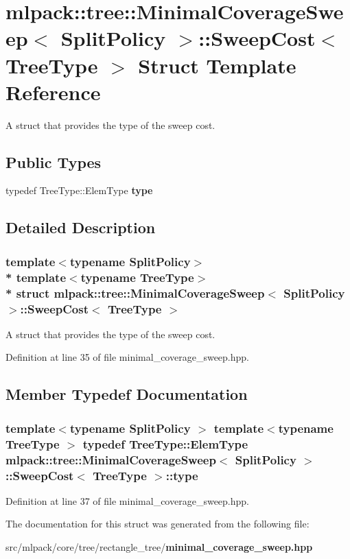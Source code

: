 \section{mlpack\+:\+:tree\+:\+:Minimal\+Coverage\+Sweep$<$ Split\+Policy $>$\+:\+:Sweep\+Cost$<$ Tree\+Type $>$ Struct Template Reference}
\label{structmlpack_1_1tree_1_1MinimalCoverageSweep_1_1SweepCost}


A struct that provides the type of the sweep cost.  


\subsection*{Public Types}
\begin{DoxyCompactItemize}
\item 
typedef Tree\+Type\+::\+Elem\+Type {\bf type}
\end{DoxyCompactItemize}


\subsection{Detailed Description}
\subsubsection*{template$<$typename Split\+Policy$>$\\*
template$<$typename Tree\+Type$>$\\*
struct mlpack\+::tree\+::\+Minimal\+Coverage\+Sweep$<$ Split\+Policy $>$\+::\+Sweep\+Cost$<$ Tree\+Type $>$}

A struct that provides the type of the sweep cost. 

Definition at line 35 of file minimal\+\_\+coverage\+\_\+sweep.\+hpp.



\subsection{Member Typedef Documentation}
\subsubsection[{type}]{\setlength{\rightskip}{0pt plus 5cm}template$<$typename Split\+Policy $>$ template$<$typename Tree\+Type $>$ typedef Tree\+Type\+::\+Elem\+Type {\bf mlpack\+::tree\+::\+Minimal\+Coverage\+Sweep}$<$ Split\+Policy $>$\+::{\bf Sweep\+Cost}$<$ Tree\+Type $>$\+::{\bf type}}\label{structmlpack_1_1tree_1_1MinimalCoverageSweep_1_1SweepCost_a2333a4c76c79a88e5238951181f65f0d}


Definition at line 37 of file minimal\+\_\+coverage\+\_\+sweep.\+hpp.



The documentation for this struct was generated from the following file\+:\begin{DoxyCompactItemize}
\item 
src/mlpack/core/tree/rectangle\+\_\+tree/{\bf minimal\+\_\+coverage\+\_\+sweep.\+hpp}\end{DoxyCompactItemize}
